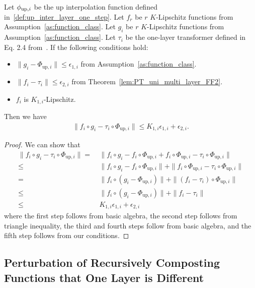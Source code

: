 \begin{lemma}
    Let $\phi_{{\rm up},i}$ be the up interpolation function defined in~\ref{def:up_inter_layer_one_step}. Let $f_r$ be $r$ $K$-Lipschitz functions from Assumption~\ref{as:function_class}. Let $g_i$ be $r$ $K$-Lipschitz functions from Assumption~\ref{as:function_class}. Let $\tau_i$ be the one-layer transformer defined in Eq. 2.4 from~\cite{hwg+24}. If the following conditions hold:
    \begin{itemize}
        \item $\|g_i - \Phi_{\mathrm{up},i}\| \leq \epsilon_{1,i}$ from Assumption~\ref{as:function_class}.
        \item $\|f_i - \tau_i\| \leq \epsilon_{2,i}$ from Theorem~\ref{lem:PT_uni_multi_layer_FF2}.
        \item $f_i$ is $K_{1,i}$-Lipschitz.
    \end{itemize}
    Then we have
    \begin{align*}
        \|f_i \circ g_i - \tau_i \circ \Phi_{\mathrm{up},i}\| \leq K_{1,i} \epsilon_{1,i} + \epsilon_{2,i}.
    \end{align*}
\end{lemma}
\begin{proof}
    We can show that
    \begin{align*}
         \| f_i \circ g_i -  \tau_i \circ \Phi_{\mathrm{up},i} \| 
         = &~ \|f_i \circ g_i- f_i \circ \Phi_{\mathrm{up},i} + f_i \circ \Phi_{\mathrm{up},i}- \tau_i \circ \Phi_{\mathrm{up},i}\| \\
         \leq &~ \|f_i \circ g_i- f_i \circ \Phi_{\mathrm{up},i}\| + \|f_i \circ \Phi_{\mathrm{up},i}- \tau_i \circ \Phi_{\mathrm{up},i}\| \\
         = &~ \|f_i \circ (g_i- \Phi_{\mathrm{up},i})\| + \|(f_i -\tau_i) \circ \Phi_{\mathrm{up},i}\| \\
         \leq &~ \|f_i \circ (g_i- \Phi_{\mathrm{up},i})\| + \|f_i -\tau_i \| \\
         \leq &~ K_{1,i} \epsilon_{1,i} + \epsilon_{2,i}
    \end{align*}
    where the first step follows from basic algebra, the second step follows from triangle inequality, the third and fourth steps follow from basic algebra, and the fifth step follows from our conditions.
\end{proof}


\subsection{Perturbation of Recursively Composting Functions that One Layer is Different}\label{sec:pertu_recursive_one}

